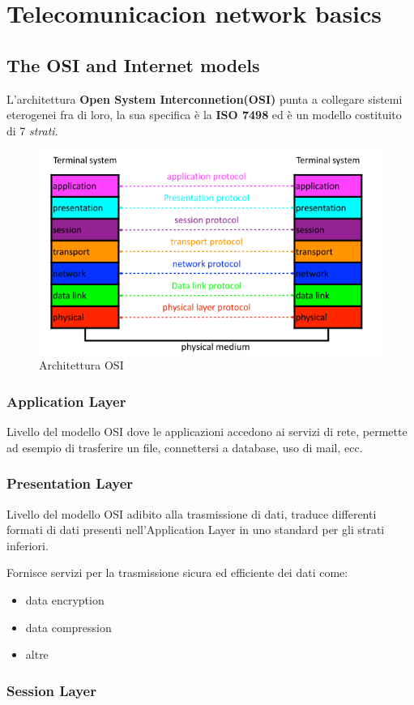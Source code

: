 \chapter{Telecomunicacion network basics}
\section{The OSI and Internet models}

L'architettura \textbf{Open System Interconnetion(OSI)} punta a collegare sistemi
eterogenei fra di loro, la sua specifica è la \textbf{ISO 7498} ed è un modello
costituito di 7 \textit{strati}.

\begin{figure}[!ht]
	\centering
	\includegraphics[width=0.4\columnwidth]{./images/osi.png}
	\caption{Architettura OSI}
	\label{fig:osi}
\end{figure}

\subsection{Application Layer}
Livello del modello OSI dove le applicazioni accedono ai servizi di rete, permette ad esempio
di trasferire un file, connettersi a database, uso di mail, ecc.

\subsection{Presentation Layer}
Livello del modello OSI adibito alla trasmissione di dati, traduce differenti formati di dati 
presenti nell'Application Layer in uno standard per gli strati inferiori.

Fornisce servizi per la trasmissione sicura ed efficiente dei dati come:
\begin{itemize}
  \item data encryption
  \item data compression
  \item altre
\end{itemize}

\subsection{Session Layer}

